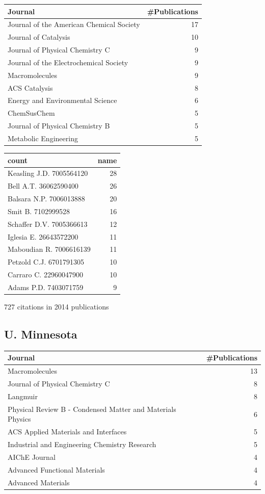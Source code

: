 \documentclass[11pt]{article}
\begin{document}
\begin{center}
\begin{tabular}{lr}
Journal & \#Publications\\
\hline
Journal of the American Chemical Society & 17\\
Journal of Catalysis & 10\\
Journal of Physical Chemistry C & 9\\
Journal of the Electrochemical Society & 9\\
Macromolecules & 9\\
ACS Catalysis & 8\\
Energy and Environmental Science & 6\\
ChemSusChem & 5\\
Journal of Physical Chemistry B & 5\\
Metabolic Engineering & 5\\
\end{tabular}
\end{center}

\begin{center}
\begin{tabular}{lr}
count & name\\
\hline
Keasling J.D. 7005564120 & 28\\
Bell A.T. 36062590400 & 26\\
Balsara N.P. 7006013888 & 20\\
Smit B. 7102999528 & 16\\
Schaffer D.V. 7005366613 & 12\\
Iglesia E. 26643572200 & 11\\
Maboudian R. 7006616139 & 11\\
Petzold C.J. 6701791305 & 10\\
Carraro C. 22960047900 & 10\\
Adams P.D. 7403071759 & 9\\
\end{tabular}
\end{center}

727 citations in 2014 publications

\subsection{U. Minnesota}
\label{sec-1-6}
\begin{center}
\begin{tabular}{lr}
Journal & \#Publications\\
\hline
Macromolecules & 13\\
Journal of Physical Chemistry C & 8\\
Langmuir & 8\\
Physical Review B - Condensed Matter and Materials Physics & 6\\
ACS Applied Materials and Interfaces & 5\\
Industrial and Engineering Chemistry Research & 5\\
AIChE Journal & 4\\
Advanced Functional Materials & 4\\
Advanced Materials & 4\\
\end{tabular}
\end{center}
\end{document}
